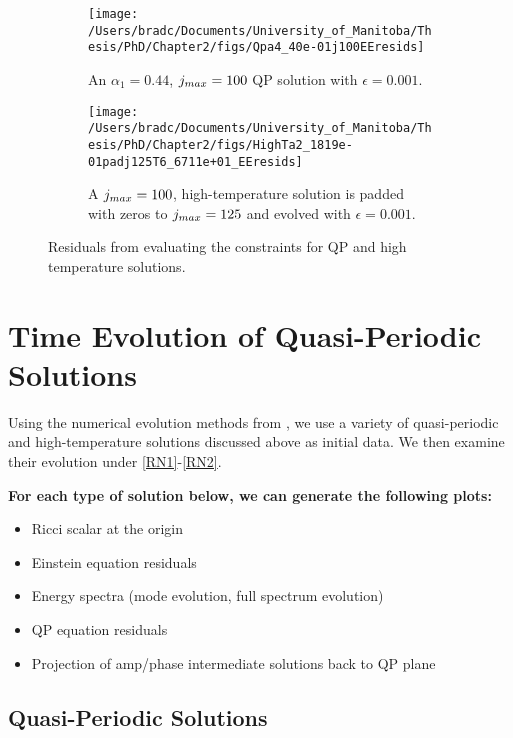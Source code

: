 \documentclass[../PhD.tex]{subfiles}
\begin{document}
\begin{figure}[h]
	\centering
	\begin{subfigure}[t]{0.45\textwidth}
		\texttt{[image: /Users/bradc/Documents/University\_of\_Manitoba/Thesis/PhD/Chapter2/figs/Qpa4\_40e-01j100EEresids]}
		\caption{An $\alpha_1 = 0.44$, $j_{max} = 100$ QP solution with $\epsilon = 0.001$.}
		\label{fig:QPEEresid}
	\end{subfigure}
	\;
	\begin{subfigure}[t]{0.45\textwidth}
		\texttt{[image: /Users/bradc/Documents/University\_of\_Manitoba/Thesis/PhD/Chapter2/figs/HighTa2\_1819e-01padj125T6\_6711e+01\_EEresids]}
		\caption{A $j_{max} = 100$, high-temperature solution is padded with zeros to $j_{max} = 125$ and evolved with $\epsilon = 0.001$.}
		\label{fig:highTEEresid}
	\end{subfigure}
	\caption{Residuals from evaluating the constraints for QP and high temperature solutions.}
	\label{fig:EEresids}
\end{figure}


\section{Time Evolution of Quasi-Periodic Solutions}
\label{sec: time evolution}

Using the numerical evolution methods from \cite{1606.02712}, we use a variety of quasi-periodic and high-temperature solutions discussed above as initial data. We then examine their evolution under \eqref{RN1}-\eqref{RN2}.

{\bf For each type of solution below, we can generate the following plots:
\begin{itemize}
\item Ricci scalar at the origin
\item Einstein equation residuals
\item Energy spectra (mode evolution, full spectrum evolution)
\item QP equation residuals 
\item Projection of amp/phase intermediate solutions back to QP plane
\end{itemize}
}


\subsection{Quasi-Periodic Solutions}
\end{document}
